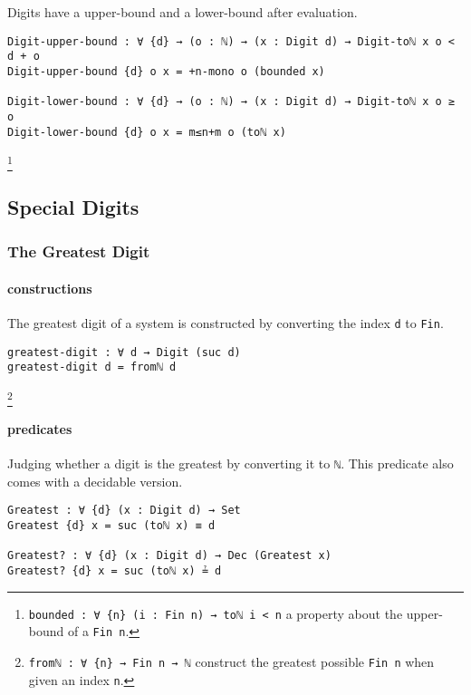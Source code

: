 \documentclass[../thesis.tex]{subfiles}
\begin{document}
Digits have a upper-bound and a lower-bound after evaluation.

\begin{lstlisting}[basicstyle=\ttfamily\scriptsize]
Digit-upper-bound : ∀ {d} → (o : ℕ) → (x : Digit d) → Digit-toℕ x o < d + o
Digit-upper-bound {d} o x = +n-mono o (bounded x)

Digit-lower-bound : ∀ {d} → (o : ℕ) → (x : Digit d) → Digit-toℕ x o ≥ o
Digit-lower-bound {d} o x = m≤n+m o (toℕ x)
\end{lstlisting}
\footnote{
    {\lstinline|bounded : ∀ {n} (i : Fin n) → toℕ i < n|}
    \newline\hspace*{4em} a property about the upper-bound of a {\lstinline|Fin n|}.
}

\subsection{Special Digits}

\subsubsection{The Greatest Digit}

\paragraph{constructions}

The greatest digit of a system is constructed by converting the index {\lstinline|d|}
to {\lstinline|Fin|}.

\begin{lstlisting}
greatest-digit : ∀ d → Digit (suc d)
greatest-digit d = fromℕ d
\end{lstlisting}
\footnote{
    {\lstinline|fromℕ : ∀ {n} → Fin n → ℕ|}
    \newline\hspace*{4em} construct the greatest possible {\lstinline|Fin n|} when given an index {\lstinline|n|}.
}

\paragraph{predicates}

Judging whether a digit is the greatest by converting it to {\lstinline|ℕ|}.
This predicate also comes with a decidable version.

\begin{lstlisting}
Greatest : ∀ {d} (x : Digit d) → Set
Greatest {d} x = suc (toℕ x) ≡ d

Greatest? : ∀ {d} (x : Digit d) → Dec (Greatest x)
Greatest? {d} x = suc (toℕ x) ≟ d
\end{lstlisting}
\end{document}
